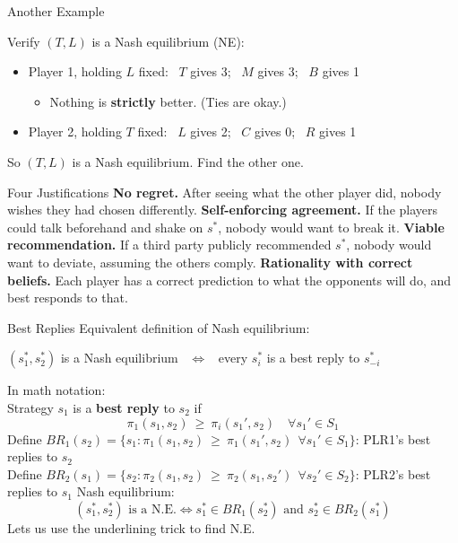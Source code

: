 \begin{frame}{Another Example}
\centering
\begin{matrixgame}[top={L, C, R}, left={T, M, B}, player names={Player 1, Player 2}]
\end{matrixgame}
\bsk
\raggedright
Verify $(T,L)$ is a Nash equilibrium (NE):
\begin{itemize}
    \item Player 1, holding $L$ fixed: \ $T$ gives 3; \ $M$ gives 3; \ $B$ gives 1 \ \checkmark
    \begin{itemize}
        \item Nothing is \textbf{strictly} better. (Ties are okay.)
    \end{itemize}
    \item Player 2, holding $T$ fixed: \ $L$ gives 2; \ $C$ gives 0; \ $R$ gives 1 \ \checkmark
\end{itemize}
\bsk
So $(T,L)$ is a Nash equilibrium. Find the other one. \vspace{0.5in}
\end{frame}

\begin{frame}{Four Justifications}
\textbf{No regret.} After seeing what the other player did, nobody wishes they had
chosen differently.
\bsk
\textbf{Self-enforcing agreement.} If the players could talk beforehand and shake on
$s^*$, nobody would want to break it.
\bsk
\textbf{Viable recommendation.} If a third party publicly recommended $s^*$, nobody
would want to deviate, assuming the others comply.
\bsk
\textbf{Rationality with correct beliefs.} Each player has a correct prediction to what the opponents will do, and best responds to that.
\vfill
\end{frame}

\begin{frame}{Best Replies}
Equivalent definition of Nash equilibrium:

\centering
\large
$(s_1^*,s_2^*)$ is a Nash equilibrium \ $\iff$ \ every $s_i^*$ is a best reply to $s_{-i}^*$
\normalsize
\bsk

\raggedright
In math notation:\\
Strategy $s_1$ is a \textbf{best reply} to $s_2$ if
$$\pi_1(s_1,s_2)\ \ge\ \pi_i(s_1',s_2)\quad\forall s_1'\in S_1$$
Define $BR_1(s_2)=\{s_1:\pi_1(s_1,s_2)\ \ge\ \pi_1(s_1',s_2)\ \ \forall s_1'\in S_1\}$: PLR1's best replies to $s_2$\\
Define $BR_2(s_1)=\{s_2:\pi_2(s_1,s_2)\ \ge\ \pi_2(s_1,s_2')\ \ \forall s_2'\in S_2\}$: PLR2's best replies to $s_1$
\bsk
Nash equilibrium:
$$
(s_1^*,s_2^*)\text{ is a N.E.} \iff s_1^*\in BR_1(s_2^*)\text{ and } s_2^*\in BR_2(s_1^*)
$$
\bsk
Lets us use the underlining trick to find N.E.
\end{frame}


